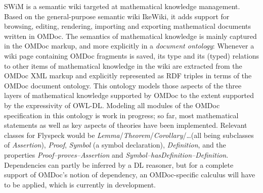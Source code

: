 SWiM is a semantic wiki targeted at mathematical knowledge management.  Based on
the general-purpose semantic wiki IkeWiki\cite{KrSchVr:semwiki-reasoning07}, it
adds support for browsing, editing, rendering, importing and exporting
mathematical documents written in OMDoc.  The semantics of mathematical
knowledge is mainly captured in the OMDoc markup, and more explicitly in a
\emph{document ontology}: Whenever a wiki page containing OMDoc fragments is
saved, its type and its (typed) relations to other items of mathematical
knowledge in the wiki are extracted from the OMDoc XML markup and explicitly
represented as RDF triples in terms of the OMDoc document
ontology\cite{OMDocDocOnto:web}.  This ontology models those aspects of the
three layers of mathematical knowledge supported by OMDoc to the extent
supported by the expressivity of OWL-DL.  
Modeling all modules of the OMDoc
specification in this ontology is work in progress; so far, most mathematical
statements as well as key aspects of theories have been implemented.  Relevant
classes for Flyspeck would be
\textit{Lemma}/\textit{Theorem}/\textit{Corollary}/\ldots (all being subclasses
of \textit{Assertion}), \textit{Proof}, \textit{Symbol} (a symbol declaration),
\textit{Definition}, and the properties \textit{Proof--proves--Assertion} and
\textit{Symbol--hasDefinition--Definition}.  Dependencies can partly be inferred
by a DL reasoner, but for a complete support of OMDoc's notion of dependency, an
OMDoc-specific calculus will have to be applied, which is currently in
development.

